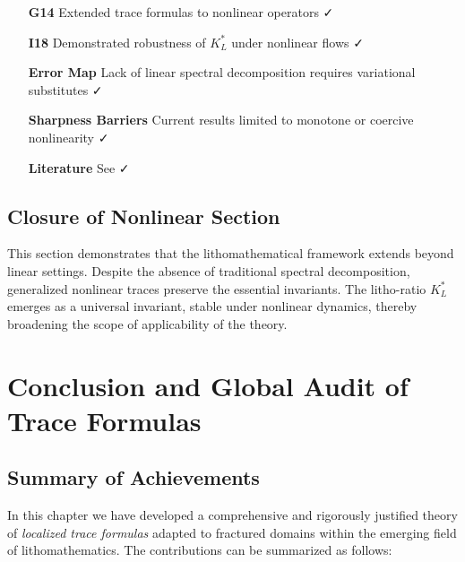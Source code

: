\begin{itemize}
  \item[\textbf{G14}] Extended trace formulas to nonlinear operators ✓
  \item[\textbf{I18}] Demonstrated robustness of $K_L^*$ under nonlinear flows ✓
  \item[\textbf{Error Map}] Lack of linear spectral decomposition requires variational substitutes ✓
  \item[\textbf{Sharpness Barriers}] Current results limited to monotone or coercive nonlinearity ✓
  \item[\textbf{Literature}] See \cite{Lions1969, Browder1968, DalMaso1993, Bourdin2008, Giacomini2012} ✓
\end{itemize}

\subsection*{Closure of Nonlinear Section}

This section demonstrates that the lithomathematical framework extends beyond linear settings.  
Despite the absence of traditional spectral decomposition, generalized nonlinear traces preserve the essential invariants.  
The litho-ratio $K_L^*$ emerges as a universal invariant, stable under nonlinear dynamics, thereby broadening the scope of applicability of the theory.

\section{Conclusion and Global Audit of Trace Formulas}
\label{sec:conclusion-trace}

\subsection{Summary of Achievements}

In this chapter we have developed a comprehensive and rigorously justified
theory of \emph{localized trace formulas} adapted to fractured domains
within the emerging field of lithomathematics.  
The contributions can be summarized as follows:

